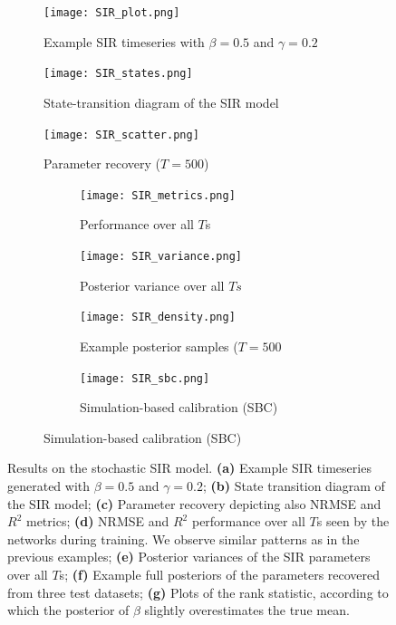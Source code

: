 \documentclass[9pt,twoside,lineno]{pnas-new}
\begin{document}
\begin{figure}[H]
\centering
\begin{subfigure}{.49\textwidth}
    \texttt{[image: SIR\_plot.png]}
    \caption{Example SIR timeseries with $\beta=0.5$ and $\gamma=0.2$}
    \label{fig:Fig.6a}
\end{subfigure}
\begin{subfigure}{.49\textwidth}
    \texttt{[image: SIR\_states.png]}
    \caption{State-transition diagram of the SIR model}
    \label{fig:Fig.6b}
\end{subfigure}
\begin{subfigure}{.49\textwidth}
    \texttt{[image: SIR\_scatter.png]}
    \caption{Parameter recovery ($T=500$)}
    \label{fig:Fig.6c}
\end{subfigure}
\begin{subfigure}{.49\textwidth}
    \centering
    \begin{subfigure}{.49\textwidth}
    	\texttt{[image: SIR\_metrics.png]}
    	\caption{Performance over all $T$s}
    	\label{fig:Fig.6d}
	\end{subfigure}
	\begin{subfigure}{.49\textwidth}
    	\texttt{[image: SIR\_variance.png]}
    	\caption{Posterior variance over all $Ts$}
    	\label{fig:Fig.6e}
	\end{subfigure}
	\begin{subfigure}{.49\textwidth}
    	\texttt{[image: SIR\_density.png]}
    	\caption{Example posterior samples ($T=500$}
    	\label{fig:Fig.6f}
	\end{subfigure}
	\begin{subfigure}{.49\textwidth}
    	\texttt{[image: SIR\_sbc.png]}
    	\caption{Simulation-based calibration (SBC)}
    	\label{fig:Fig.6g}
	\end{subfigure}
\end{subfigure}
\caption[short]{Results on the stochastic SIR model. \textbf{(a)} Example SIR timeseries generated with $\beta=0.5$ and $\gamma=0.2$; \textbf{(b)} State transition diagram of the SIR model; \textbf{(c)} Parameter recovery depicting also NRMSE and $R^{2}$ metrics; \textbf{(d)} NRMSE and $R^{2}$ performance over all $T$s seen by the networks during training. We observe similar patterns as in the previous examples; \textbf{(e)} Posterior variances of the SIR parameters over all $T$s; \textbf{(f)} Example full posteriors of the parameters recovered from three test datasets; \textbf{(g)} Plots of the rank statistic, according to which the posterior of $\beta$ slightly overestimates the true mean.} \label{fig:Fig.6}
\end{figure}
\end{document}
